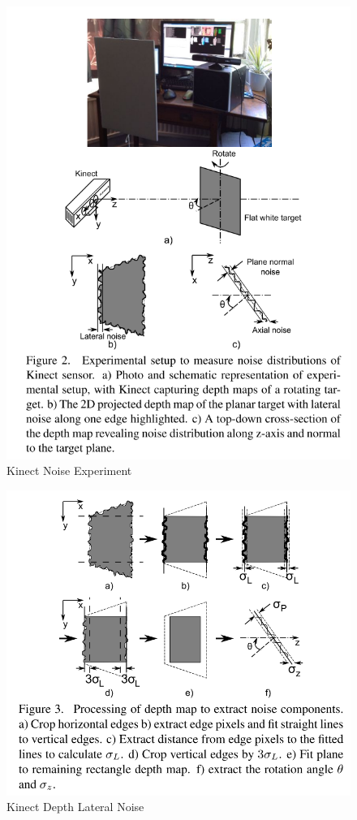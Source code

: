 \documentclass[a4paper]{report}
\numberwithin{figure}{section}
\begin{document}
\begin{figure}[H]
	\centering
  \includegraphics[width=0.7\linewidth,natwidth=640,natheight=640]
  {fig/ref_imgs/kinect_noise_experiment.png}
  \caption{Kinect Noise Experiment}
	\label{fig:kinect_noise_experiment}
\end{figure}


\begin{figure}[H]
	\centering
  \includegraphics[width=0.7\linewidth,natwidth=640,natheight=640]
  {fig/ref_imgs/kinect_depth_lateral_noise.png}
  \caption{Kinect Depth Lateral Noise}
	\label{fig:kinect_depth_lateral_noise}
\end{figure}
\end{document}
